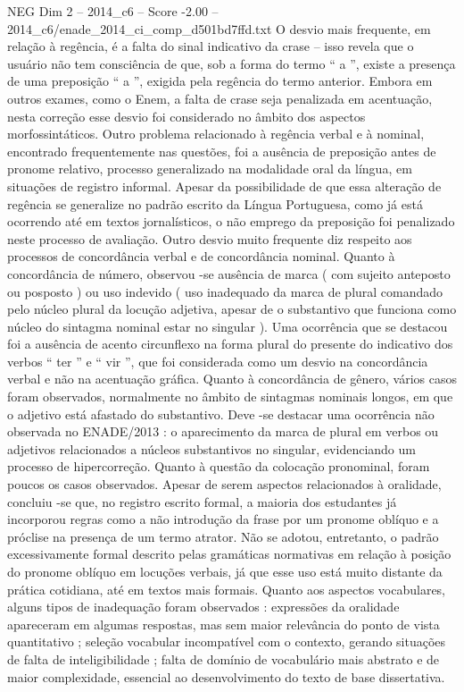 \begin{textsample}{NEG Dim 2 – 2014\_c6 – Score -2.00 – 2014\_c6/enade\_2014\_ci\_comp\_d501bd7ffd.txt}
O desvio mais frequente, em relação à regência, é a falta do sinal indicativo da crase – isso revela que o usuário não tem consciência de que, sob a forma do termo “ a ”, existe a presença de uma preposição “ a ”, exigida pela regência do termo anterior.
Embora em outros exames, como o Enem, a falta de crase seja penalizada em acentuação, nesta correção esse desvio foi considerado no âmbito dos aspectos morfossintáticos.
Outro problema relacionado à regência verbal e à nominal, encontrado frequentemente nas questões, foi a ausência de preposição antes de pronome relativo, processo generalizado na modalidade oral da língua, em situações de registro informal.
Apesar da possibilidade de que essa alteração de regência se generalize no padrão escrito da Língua Portuguesa, como já está ocorrendo até em textos jornalísticos, o não emprego da preposição foi penalizado neste processo de avaliação.
Outro desvio muito frequente diz respeito aos processos de concordância verbal e de concordância nominal.
Quanto à concordância de número, observou -se ausência de marca ( com sujeito anteposto ou posposto ) ou uso indevido ( uso inadequado da marca de plural comandado pelo núcleo plural da locução adjetiva, apesar de o substantivo que funciona como núcleo do sintagma nominal estar no singular ).
Uma ocorrência que se destacou foi a ausência de acento circunflexo na forma plural do presente do indicativo dos verbos “ ter ” e “ vir ”, que foi considerada como um desvio na concordância verbal e não na acentuação gráfica.
Quanto à concordância de gênero, vários casos foram observados, normalmente no âmbito de sintagmas nominais longos, em que o adjetivo está afastado do substantivo.
Deve -se destacar uma ocorrência não observada no ENADE/2013 : o aparecimento da marca de plural em verbos ou adjetivos relacionados a núcleos substantivos no singular, evidenciando um processo de hipercorreção.
Quanto à questão da colocação pronominal, foram poucos os casos observados.
Apesar de serem aspectos relacionados à oralidade, concluiu -se que, no registro escrito formal, a maioria dos estudantes já incorporou regras como a não introdução da frase por um pronome oblíquo e a próclise na presença de um termo atrator.
Não se adotou, entretanto, o padrão excessivamente formal descrito pelas gramáticas normativas em relação à posição do pronome oblíquo em locuções verbais, já que esse uso está muito distante da prática cotidiana, até em textos mais formais.
Quanto aos aspectos vocabulares, alguns tipos de inadequação foram observados : expressões da oralidade apareceram em algumas respostas, mas sem maior relevância do ponto de vista quantitativo ; seleção vocabular incompatível com o contexto, gerando situações de falta de inteligibilidade ; falta de domínio de vocabulário mais abstrato e de maior complexidade, essencial ao desenvolvimento do texto de base dissertativa.

\end{textsample}
